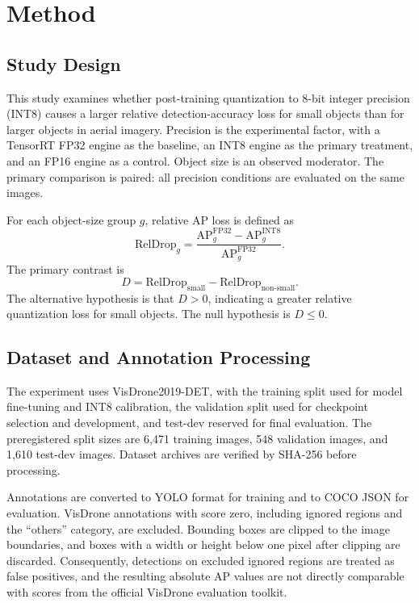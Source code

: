 \section{Method}
\label{sec:method}

\subsection{Study Design}
This study examines whether post-training quantization to 8-bit integer precision
(INT8) causes a larger relative detection-accuracy loss for small objects than
for larger objects in aerial imagery. Precision is the experimental factor, with
a TensorRT FP32 engine as the baseline, an INT8 engine as the primary treatment,
and an FP16 engine as a control. Object size is an observed moderator. The
primary comparison is paired: all precision conditions are evaluated on the same
images.

For each object-size group $g$, relative AP loss is defined as
\begin{equation}
\mathrm{RelDrop}_{g} =
\frac{\mathrm{AP}^{\mathrm{FP32}}_{g}
- \mathrm{AP}^{\mathrm{INT8}}_{g}}
{\mathrm{AP}^{\mathrm{FP32}}_{g}}.
\label{eq:relative-ap-drop}
\end{equation}
The primary contrast is
\begin{equation}
D = \mathrm{RelDrop}_{\mathrm{small}}
- \mathrm{RelDrop}_{\mathrm{non\text{-}small}}.
\label{eq:size-interaction}
\end{equation}
The alternative hypothesis is that $D>0$, indicating a greater relative
quantization loss for small objects. The null hypothesis is $D\leq 0$.

\subsection{Dataset and Annotation Processing}
The experiment uses VisDrone2019-DET, with the training split used for model
fine-tuning and INT8 calibration, the validation split used for checkpoint
selection and development, and test-dev reserved for final evaluation. The
preregistered split sizes are 6,471 training images, 548 validation images, and
1,610 test-dev images. Dataset archives are verified by SHA-256 before
processing.

Annotations are converted to YOLO format for training and to COCO JSON for
evaluation. VisDrone annotations with score zero, including ignored regions and
the ``others'' category, are excluded. Bounding boxes are clipped to the image
boundaries, and boxes with a width or height below one pixel after clipping are
discarded. Consequently, detections on excluded ignored regions are treated as
false positives, and the resulting absolute AP values are not directly
comparable with scores from the official VisDrone evaluation toolkit.

